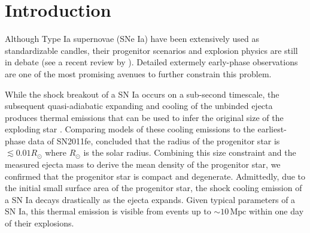 \documentclass[twocolumn]{aastex61}
\newcommand{\sr}{R_\odot}
\begin{document}


\section{Introduction}
\label{sec:intro}

Although Type Ia supernovae (SNe Ia) have been extensively used as
standardizable candles, their progenitor scenarios and explosion
physics are still in debate (see a recent review by
\citealt{2014ARA&A..52..107M}). Detailed extermely early-phase
observations are one of the most promising avenues to further
constrain this problem.

While the shock breakout of a SN Ia occurs on a sub-second timescale,
the subsequent quasi-adiabatic expanding and cooling of the unbinded
ejecta produces thermal emissions that can be used to infer the
original size of the exploding star
\citep{2010ApJ...708..598P,2011ApJ...728...63R}. Comparing models of
these cooling emissions to the earliest-phase data of SN2011fe,
\citet{2012ApJ...744L..17B} concluded that the radius of the
progenitor star is $\lesssim0.01\sr$ where $\sr$ is the solar
radius. Combining this size constraint and the measured ejecta mass to
derive the mean density of the progenitor star, we confirmed that the
progenitor star is compact and degenerate. Admittedly, due to the
initial small surface area of the progenitor star, the shock cooling
emission of a SN Ia decays drastically as the ejecta expands. Given
typical parameters of a SN Ia, this thermal emission is visible from
events up to $\sim 10\,\textrm{Mpc}$ within one day of their explosions.
\end{document}
